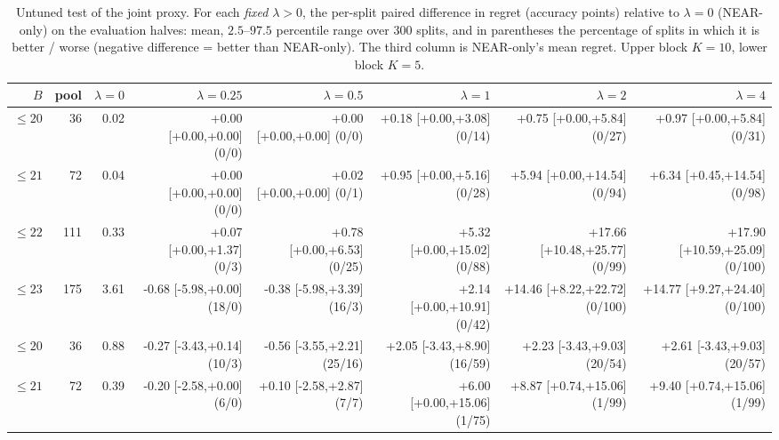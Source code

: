 \begin{table}[h]
\centering
\caption{Untuned test of the joint proxy.  For each \emph{fixed} $\lambda>0$, the per-split paired difference in regret (accuracy points) relative to $\lambda=0$ (NEAR-only) on the evaluation halves: mean, $2.5$--$97.5$ percentile range over 300 splits, and in parentheses the percentage of splits in which
  it is better / worse (negative difference = better than NEAR-only).  The third column is NEAR-only's mean regret.  Upper block $K=10$, lower block $K=5$.}
\label{tab:lambda}
\scriptsize
\begin{tabular}{rrrrrrrr}
\toprule
$B$ & pool & $\lambda{=}0$ & $\lambda{=}0.25$ & $\lambda{=}0.5$ & $\lambda{=}1$ & $\lambda{=}2$ & $\lambda{=}4$ \\
\midrule
$\le20$ & 36 & 0.02 & +0.00 {\scriptsize[+0.00,+0.00]} {\scriptsize(0/0)} & +0.00 {\scriptsize[+0.00,+0.00]} {\scriptsize(0/0)} & +0.18 {\scriptsize[+0.00,+3.08]} {\scriptsize(0/14)} & +0.75 {\scriptsize[+0.00,+5.84]} {\scriptsize(0/27)} & +0.97 {\scriptsize[+0.00,+5.84]} {\scriptsize(0/31)} \\
$\le21$ & 72 & 0.04 & +0.00 {\scriptsize[+0.00,+0.00]} {\scriptsize(0/0)} & +0.02 {\scriptsize[+0.00,+0.00]} {\scriptsize(0/1)} & +0.95 {\scriptsize[+0.00,+5.16]} {\scriptsize(0/28)} & +5.94 {\scriptsize[+0.00,+14.54]} {\scriptsize(0/94)} & +6.34 {\scriptsize[+0.45,+14.54]} {\scriptsize(0/98)} \\
$\le22$ & 111 & 0.33 & +0.07 {\scriptsize[+0.00,+1.37]} {\scriptsize(0/3)} & +0.78 {\scriptsize[+0.00,+6.53]} {\scriptsize(0/25)} & +5.32 {\scriptsize[+0.00,+15.02]} {\scriptsize(0/88)} & +17.66 {\scriptsize[+10.48,+25.77]} {\scriptsize(0/99)} & +17.90 {\scriptsize[+10.59,+25.09]} {\scriptsize(0/100)} \\
$\le23$ & 175 & 3.61 & -0.68 {\scriptsize[-5.98,+0.00]} {\scriptsize(18/0)} & -0.38 {\scriptsize[-5.98,+3.39]} {\scriptsize(16/3)} & +2.14 {\scriptsize[+0.00,+10.91]} {\scriptsize(0/42)} & +14.46 {\scriptsize[+8.22,+22.72]} {\scriptsize(0/100)} & +14.77 {\scriptsize[+9.27,+24.40]} {\scriptsize(0/100)} \\
\midrule
$\le20$ & 36 & 0.88 & -0.27 {\scriptsize[-3.43,+0.14]} {\scriptsize(10/3)} & -0.56 {\scriptsize[-3.55,+2.21]} {\scriptsize(25/16)} & +2.05 {\scriptsize[-3.43,+8.90]} {\scriptsize(16/59)} & +2.23 {\scriptsize[-3.43,+9.03]} {\scriptsize(20/54)} & +2.61 {\scriptsize[-3.43,+9.03]} {\scriptsize(20/57)} \\
$\le21$ & 72 & 0.39 & -0.20 {\scriptsize[-2.58,+0.00]} {\scriptsize(6/0)} & +0.10 {\scriptsize[-2.58,+2.87]} {\scriptsize(7/7)} & +6.00 {\scriptsize[+0.00,+15.06]} {\scriptsize(1/75)} & +8.87 {\scriptsize[+0.74,+15.06]} {\scriptsize(1/99)} & +9.40 {\scriptsize[+0.74,+15.06]} {\scriptsize(1/99)} \\

\end{tabular}
\end{table}
